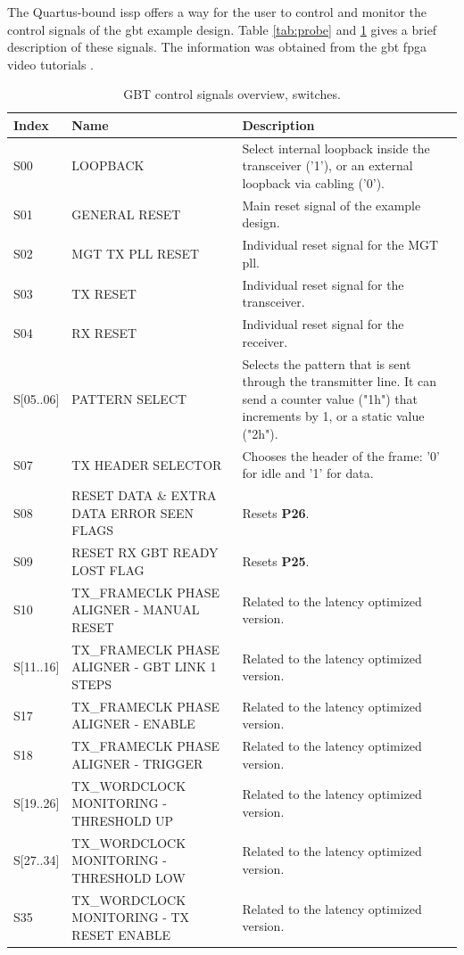 \documentclass[main.tex]{subfiles}
\begin{document}
The Quartus-bound \gls{issp} offers a way for the user to control and monitor the control signals of the \gls{gbt} example design. Table \ref{tab:probe} and \ref{tab:switch} gives a brief description of these signals. The information was obtained from the \gls{gbt} \gls{fpga} video tutorials \cite{gbt_videos}.
\begin{table}[H]
\small
\begin{center}
  \begin{tabular}{| l | p{5cm} | p{8cm} |}
  \hline
    Index & Name & Description   \\
    \hline
  S00     & LOOPBACK                        & Select internal loopback inside the transceiver ('1'), or an external loopback via cabling ('0'). \\ \hline
  S01     & GENERAL RESET                     & Main reset signal of the example design. \\ \hline
  S02     & MGT TX PLL RESET                    & Individual reset signal for the MGT pll. \\ \hline
  S03     & TX RESET                        & Individual reset signal for the transceiver. \\ \hline
  S04     & RX RESET                        & Individual reset signal for the receiver. \\ \hline
  S[05..06]   & PATTERN SELECT                    & Selects the pattern that is sent through the transmitter line.
  It can send a counter value ("1h") that increments by 1, or a static value ("2h"). \\ \hline
  S07     & TX HEADER SELECTOR                  & Chooses the header of the frame: '0' for idle and '1' for data. \\ \hline
  S08     & RESET DATA \& EXTRA DATA ERROR SEEN FLAGS       & Resets \textbf{P26}.\\ \hline
  S09     & RESET RX GBT READY LOST FLAG              & Resets \textbf{P25}.\\ \hline
  S10     & TX\_FRAMECLK PHASE ALIGNER - MANUAL RESET         & Related to the latency optimized version.\\ \hline
  S[11..16] & TX\_FRAMECLK PHASE ALIGNER - GBT LINK 1 STEPS       & Related to the latency optimized version.\\ \hline
  S17     & TX\_FRAMECLK PHASE ALIGNER - ENABLE           & Related to the latency optimized version.\\ \hline
  S18     & TX\_FRAMECLK PHASE ALIGNER - TRIGGER          & Related to the latency optimized version.\\ \hline
  S[19..26]   & TX\_WORDCLOCK MONITORING - THRESHOLD UP         & Related to the latency optimized version.\\ \hline
  S[27..34]   & TX\_WORDCLOCK MONITORING - THRESHOLD LOW        & Related to the latency optimized version.\\ \hline
  S35     & TX\_WORDCLOCK MONITORING - TX RESET ENABLE      & Related to the latency optimized version.\\ \hline
  \end{tabular}
    \caption{GBT control signals overview, switches.}
  \label{tab:switch}  
\end{center}
\end{table}
\end{document}
